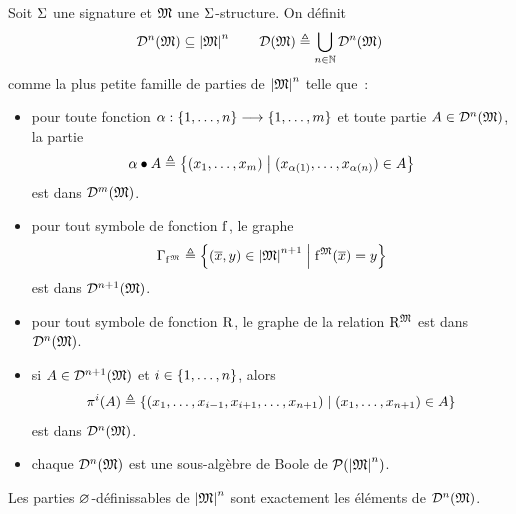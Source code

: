 \begin{proposition}
  Soit $\Sigma$ une signature et $\mathfrak{M}$ une $\Sigma$-structure. On définit
  \[\mathcal{D}^n(\mathfrak{M}) \subseteq\left\vert \mathfrak{M}\right\vert^n \qquad
  \mathcal{D}(\mathfrak{M})\triangleq \bigcup_{n \in \mathbb N} \mathcal{D}^n(\mathfrak{M})\]
  comme la plus petite famille de parties de $\left\vert \mathfrak{M}\right\vert^n$ telle que~:
  \begin{itemize}
  \item pour toute fonction
    $\alpha : \displaystyle \{1,\ldots,n\} \longrightarrow \{1,\ldots,m\}$ et toute partie
    $A\in\mathcal{D}^{n}(\mathfrak{M})$, la partie
    \[\alpha\mathbin{\bullet}A \triangleq
    \left\{ (x_1,\ldots,x_m) \;\middle\vert\; (x_{\alpha(1)},\ldots,x_{\alpha(n)})\in A \right\}\]
    est dans $\mathcal{D}^{m}(\mathfrak{M})$.
  \item pour tout symbole de fonction $\mathrm{f}$, le graphe
    \[\Gamma_{\mathrm{f}^{\mathfrak{M}}} \triangleq
    \left\{ (\overline{x},y)\in\left\vert \mathfrak{M}\right\vert^{n+1} \;\middle\vert\; \mathrm{f}^{\mathfrak{M}}(\overline{x}) = y \right\}\]
    est dans $\mathcal{D}^{n+1}(\mathfrak{M})$.
  \item pour tout symbole de fonction $\mathrm{R}$, le graphe de la relation
    $\mathrm{R}^{\mathfrak{M}}$ est dans $\mathcal{D}^n(\mathfrak{M})$.
  \item si $A\in\mathcal{D}^{n+1}(\mathfrak{M})$ et $i \in \{1,\ldots,n\}$, alors
    \[\mathop{\pi_{}^{i}}(A) \triangleq
    \left\{ (x_1,\ldots,x_{i-1},x_{i+1},\ldots,x_{n+1}) \;\middle\vert\; (x_1,\ldots,x_{n+1})\in A \right\}
    \]
    est dans $\mathcal{D}^{n}(\mathfrak{M})$.
  \item chaque $\mathcal{D}^{n}(\mathfrak{M})$ est une sous-algèbre de Boole de
    $\mathcal{P}(\left\vert \mathfrak{M}\right\vert^n)$.
  \end{itemize}
  Les parties $\varnothing$-définissables de $\left\vert \mathfrak{M}\right\vert^n$ sont exactement les éléments
  de $\mathcal{D}^{n}(\mathfrak{M})$.
\end{proposition}

